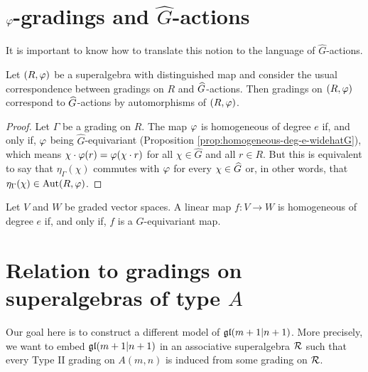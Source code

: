 \documentclass{amsbook}
\begin{document}
\section{$\varphi$-gradings and $\widehat G$-actions}

It is important to know how to translate this notion to the language of $\widehat G$-actions.

\begin{prop}
    Let $(R, \varphi)$ be a superalgebra with distinguished map and consider the usual correspondence between gradings on $R$ and $\widehat G$-actions. Then gradings on $(R, \varphi)$ correspond to $\widehat G$-actions by automorphisms of $(R, \varphi)$.
\end{prop}

\begin{proof}
    Let $\Gamma$ be a grading on $R$. The map $\varphi$ is homogeneous of degree $e$ if, and only if, $\varphi$ being $\widehat G$-equivariant (Proposition \ref{prop:homogeneous-deg-e-widehatG}), which means $\chi\cdot \varphi (r) = \varphi (\chi\cdot r)$ for all $\chi \in \widehat G$ and all $r \in R$. But this is equivalent to say that $\eta_\Gamma(\chi)$ commutes with $\varphi$ for every $\chi \in \widehat G$ or, in other words, that $\eta_\Gamma(\chi) \in \operatorname{Aut} (R, \varphi)$. 
\end{proof}

\begin{prop}\label{prop:homogeneous-deg-e-widehatG}
    Let $V$ and $W$ be graded vector spaces. A linear map $f: V \to W$ is homogeneous of degree $e$ if, and only if, $f$ is a $\widehat G$-equivariant map.
\end{prop}

\section{Relation to gradings on superalgebras of type $A$}


Our goal here is to construct a different model of $\mathfrak{gl}(m+1 | n+1)$. More precisely, we want to embed $\mathfrak{gl}(m+1 | n+1)$ in an associative superalgebra $\mathcal R$ such that every Type II grading on $A(m,n)$ is induced from some grading on $\mathcal R$.
\end{document}
